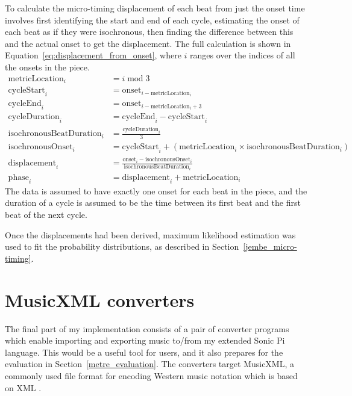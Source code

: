 \documentclass[12pt,twoside,openright]{report}
\begin{document}
To calculate the micro-timing displacement of each beat from just the onset time
involves first identifying the start and end of each cycle, estimating the onset
of each beat as if they were isochronous, then finding the difference between this
and the actual onset to get the displacement. The full calculation is shown in
Equation~\ref{eq:displacement_from_onset}, where $i$ ranges over the indices of all the onsets in the piece.
\begin{equation}
\begin{split}
    \mathrm{metricLocation}_i &= i \;\mathrm{mod}\; 3 \\
    \mathrm{cycleStart}_i     &= \mathrm{onset}_{i-\mathrm{metricLocation}_i} \\
    \mathrm{cycleEnd}_i       &= \mathrm{onset}_{i-\mathrm{metricLocation}_i+3} \\
    \mathrm{cycleDuration}_i  &= \mathrm{cycleEnd}_i - \mathrm{cycleStart}_i \\
    \mathrm{isochronousBeatDuration}_i &= \frac{\mathrm{cycleDuration}_i}{3} \\
    \mathrm{isochronousOnset}_i &= \mathrm{cycleStart}_i + (\mathrm{metricLocation}_i \times \mathrm{isochronousBeatDuration}_i) \\
    \mathrm{displacement}_i &= \frac{\mathrm{onset}_i-\mathrm{isochronousOnset}_i}{\mathrm{isochronousBeatDuration}_i} \\
    \mathrm{phase}_i          &= \mathrm{displacement}_i + \mathrm{metricLocation}_i
\end{split}
\label{eq:displacement_from_onset}
\end{equation}
The data is assumed to have exactly one onset for each beat in the piece, and the
duration of a cycle is assumed to be the time between its first beat and the
first beat of the next cycle.

Once the displacements had been derived, maximum
likelihood estimation was used to fit the probability distributions, as described in
Section~\ref{jembe_micro-timing}.
\newpage



\section{MusicXML converters} \label{musicxml_converters}

The final part of my implementation consists of a pair of converter programs which enable importing and exporting music to/from my extended Sonic Pi language. This would be a useful tool for users, and it also prepares for the evaluation in Section~\ref{metre_evaluation}. The converters target MusicXML, a commonly used file format for encoding Western music notation which is based on XML \cite{good2001}.
\end{document}
